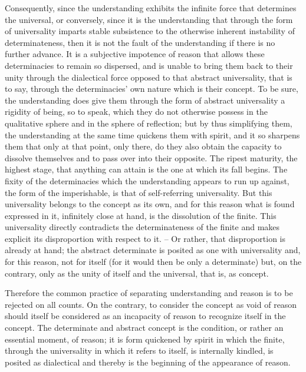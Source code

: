 Consequently, since the understanding exhibits the infinite force that
determines the universal, or conversely, since it is the understanding that
through the form of universality imparts stable subsistence to the otherwise
inherent instability of determinateness, then it is not the fault of the
understanding if there is no further advance. It is a subjective impotence of
reason that allows these determinacies to remain so dispersed, and is unable
to bring them back to their unity through the dialectical force opposed
to that abstract universality, that is to say, through the determinacies' own
nature which is their concept. To be sure, the understanding does give
them through the form of abstract universality a rigidity of being, so to
speak, which they do not otherwise possess in the qualitative sphere and in
the sphere of reflection; but by thus simplifying them, the understanding
at the same time quickens them with spirit, and it so sharpens them that
only at that point, only there, do they also obtain the capacity to dissolve
themselves and to pass over into their opposite. The ripest maturity, the
highest stage, that anything can attain is the one at which its fall begins.
The fixity of the determinacies which the understanding appears to run up
against, the form of the imperishable, is that of self-referring universality.
But this universality belongs to the concept as its own, and for this reason
what is found expressed in it, infinitely close at hand, is the dissolution of
the finite. This universality directly contradicts the determinateness of the
finite and makes explicit its disproportion with respect to it. – Or rather,
that disproportion is already at hand; the abstract determinate is posited as
one with universality and, for this reason, not for itself (for it would then
be only a determinate) but, on the contrary, only as the unity of itself and
the universal, that is, as concept.

Therefore the common practice
of separating understanding and reason
is to be rejected on all counts.
On the contrary, to consider the concept
as void of reason should itself be
considered as an incapacity of reason
to recognize itself in the concept.
The determinate and abstract concept is the condition,
or rather an essential moment, of reason;
it is form quickened by spirit in which the finite,
through the universality in which it refers to itself,
is internally kindled, is posited as dialectical
and thereby is the beginning of the appearance of reason.

